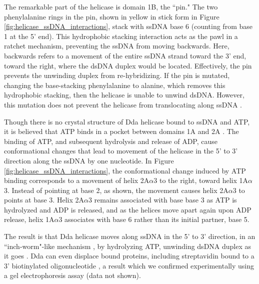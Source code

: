The remarkable part of the helicase is domain 1B, the ``pin."  The two phenylalanine rings in the pin, shown in yellow in stick form in Figure \ref{fig:helicase_ssDNA_interactions}, stack with ssDNA base 6 (counting from base 1 at the 5' end).  This hydrophobic stacking interaction acts as the pawl in a ratchet mechanism, preventing the ssDNA from moving backwards.  Here, backwards refers to a movement of the entire ssDNA strand toward the 3' end, toward the right, where the dsDNA duplex would be located.  Effectively, the pin prevents the unwinding duplex from re-hybridizing.  If the pin is mutated, changing the base-stacking phenylalanine to alanine, which removes this hydrophobic stacking, then the helicase is unable to unwind dsDNA.  However, this mutation does not prevent the helicase from translocating along ssDNA \citep{He2012}.

Though there is no crystal structure of Dda helicase bound to ssDNA and ATP, it is believed that ATP binds in a pocket between domains 1A and 2A \citep{He2012}.  The binding of ATP, and subsequent hydrolysis and release of ADP, cause conformational changes that lead to movement of the helicase in the 5' to 3' direction along the ssDNA by one nucleotide.  In Figure \ref{fig:helicase_ssDNA_interactions}, the conformational change induced by ATP binding corresponds to a movement of helix 2A$\alpha$3 to the right, toward helix 1A$\alpha$3.  Instead of pointing at base 2, as shown, the movement causes helix 2A$\alpha$3 to points at base 3.  Helix 2A$\alpha$3 remains associated with base base 3 as ATP is hydrolyzed and ADP is released, and as the helices move apart again upon ADP release, helix 1A$\alpha$3 associates with base 6 rather than its initial partner, base 5.

The result is that Dda helicase moves along ssDNA in the 5' to 3' direction, in an ``inch-worm"-like mechanism \citep{Spurling2006}, by hydrolyzing ATP, unwinding dsDNA duplex as it goes \citep{Byrd2012}.  Dda can even displace bound proteins, including streptavidin bound to a 3' biotinylated oligonucleotide \citep{Morris1999}, a result which we confirmed experimentally using a gel electrophoresis assay (data not shown). %
